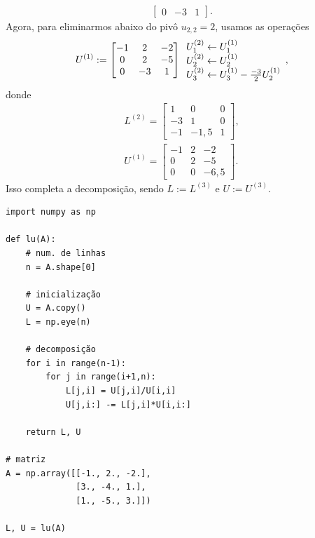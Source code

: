 \begin{ex}
\begin{align}
\begin{bmatrix}
      0 & -3 & 1
    \end{bmatrix}.
  \end{align}
  Agora, para eliminarmos abaixo do pivô $u_{2,2}=2$, usamos as operações
  \begin{equation}
    U^{(1)} :=
    \begin{bmatrix}
      -1 & 2 & -2\\
      0 & 2 & -5\\
      0 & -3 & 1
    \end{bmatrix}
    \begin{array}[]l
      U_1^{(2)}\leftarrow U_1^{(1)} \\
      U_2^{(2)}\leftarrow U_2^{(1)} \\
      U_3^{(2)}\leftarrow U_3^{(1)} - \frac{-3}{2}U_2^{(1)}
    \end{array},
  \end{equation}
  donde
  \begin{align}
    L^{(2)} =
    \begin{bmatrix}
      1 & 0 & 0\\
      -3 & 1 & 0\\
      -1 & -1,5 & 1
    \end{bmatrix},\\
    U^{(1)} =
    \begin{bmatrix}
      -1 & 2 & -2\\
      0 & 2 & -5\\
      0 & 0 & -6,5
    \end{bmatrix}.
  \end{align}
Isso completa a decomposição, sendo $L := L^{(3)}$ e $U := U^{(3)}$.

\begin{lstlisting}[caption=lu.py, label='cap_sislin_sec_lu:cod:lu']
import numpy as np

def lu(A):
    # num. de linhas
    n = A.shape[0]

    # inicialização
    U = A.copy()
    L = np.eye(n)

    # decomposição
    for i in range(n-1):
        for j in range(i+1,n):
            L[j,i] = U[j,i]/U[i,i]
            U[j,i:] -= L[j,i]*U[i,i:]

    return L, U

# matriz
A = np.array([[-1., 2., -2.],
              [3., -4., 1.],
              [1., -5., 3.]])

L, U = lu(A)
\end{lstlisting}
\end{ex}

